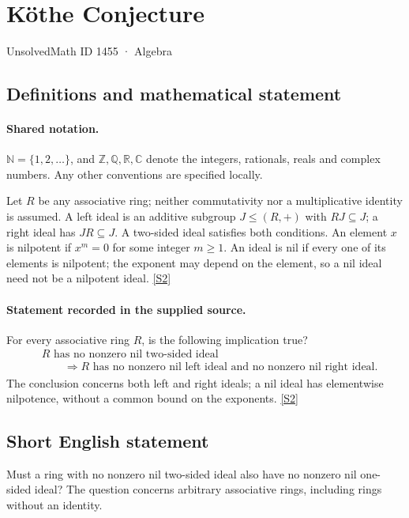 \documentclass[11pt]{article}
\newcommand{\sref}[2]{\hyperlink{source:#1:#2}{[S#2]}}
\begin{document}
\setcounter{section}{1454}
\section{Köthe Conjecture}\label{1455}
{\small\sffamily UnsolvedMath ID 1455 · Algebra}
\subsection{Definitions and mathematical statement}

\paragraph{Shared notation.}$\mathbb N=\{1,2,\ldots\}$, and $\mathbb Z,\mathbb Q,\mathbb R,\mathbb C$ denote the integers, rationals, reals and complex numbers. Any other conventions are specified locally.


Let $R$ be any associative ring; neither commutativity nor a multiplicative identity is assumed. A left ideal is an additive subgroup $J\le(R,+)$ with $RJ\subseteq J$; a right ideal has $JR\subseteq J$. A two-sided ideal satisfies both conditions. An element $x$ is nilpotent if $x^m=0$ for some integer $m\ge1$. An ideal is nil if every one of its elements is nilpotent; the exponent may depend on the element, so a nil ideal need not be a nilpotent ideal. \sref{1455}{2}
\paragraph{Statement recorded in the supplied source.}
For every associative ring $R$, is the following implication true?
\[
 \begin{aligned}
 &R\text{ has no nonzero nil two-sided ideal}\\
 &\qquad\Longrightarrow
 R\text{ has no nonzero nil left ideal and no nonzero nil right ideal}.
 \end{aligned}
\]
The conclusion concerns both left and right ideals; a nil ideal has elementwise nilpotence, without a common bound on the exponents. \sref{1455}{2}
\subsection{Short English statement}
Must a ring with no nonzero nil two-sided ideal also have no nonzero nil one-sided ideal? The question concerns arbitrary associative rings, including rings without an identity.
\end{document}
